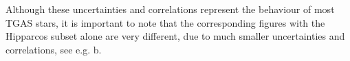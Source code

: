 Although these uncertainties and correlations represent the behaviour of most TGAS stars, 
it is important to note that the corresponding figures with the Hipparcos subset 
alone are very different, due to much smaller uncertainties and correlations, 
see e.g. b.

%


%	

%

%	
	
	
